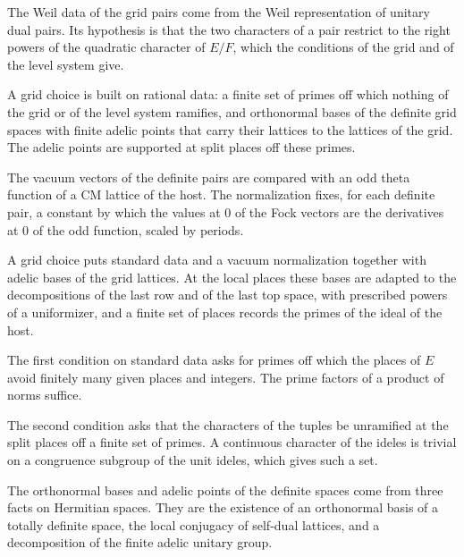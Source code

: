 The Weil data of the grid pairs come from the Weil representation of unitary dual pairs. Its hypothesis is that
the two characters of a pair restrict to the right powers of the quadratic character of $E/F$, which the conditions
of the grid and of the level system give.

A grid choice is built on rational data: a finite set of primes off which nothing of the grid or of the level system
ramifies, and orthonormal bases of the definite grid spaces with finite adelic points that carry their lattices to the
lattices of the grid. The adelic points are supported at split places off these primes.

The vacuum vectors of the definite pairs are compared with an odd theta function of a CM lattice of the host. The
normalization fixes, for each definite pair, a constant by which the values at $0$ of the Fock vectors are the
derivatives at $0$ of the odd function, scaled by periods.

A grid choice puts standard data and a vacuum normalization together with adelic bases of the grid lattices. At the
local places these bases are adapted to the decompositions of the last row and of the last top space, with prescribed
powers of a uniformizer, and a finite set of places records the primes of the ideal of the host.

The first condition on standard data asks for primes off which the places of $E$ avoid finitely many given places
and integers. The prime factors of a product of norms suffice.

The second condition asks that the characters of the tuples be unramified at the split places off a finite set of
primes. A continuous character of the ideles is trivial on a congruence subgroup of the unit ideles, which gives such a
set.

The orthonormal bases and adelic points of the definite spaces come from three facts on Hermitian spaces. They are the
existence of an orthonormal basis of a totally definite space, the local conjugacy of self-dual lattices, and a
decomposition of the finite adelic unitary group.

